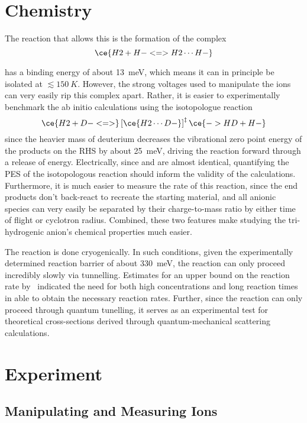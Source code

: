 \documentclass[12pt]{article}
\begin{document}
\section{Chemistry}
The reaction that allows this is the formation of the complex
\begin{equation}
    \ce{H2 + H- <=> H2\cdots H-} \label{eq:h3}
\end{equation}

 has a binding energy of about \SI{13}{meV}, which means it can in principle be isolated at \( \lesssim\SI{150}{K} \). However, the strong voltages used to manipulate the ions can very easily rip this complex apart. Rather, it is easier to experimentally benchmark the ab initio calculations using the isotopologue reaction
\begin{equation}
    \ce{H2 + D- <=>} \left[\ce{H2\cdots D-} \right]^\ddagger \ce{-> HD + H- } \label{eq:h2d}
\end{equation}
since the heavier mass of deuterium decreases the vibrational zero point energy of the products on the RHS by about \SI{25}{meV}, driving the reaction forward through a release of energy. Electrically, since  and  are almost identical, quantifying the PES of the isotopologous reaction should inform the validity of the  calculations. Furthermore, it is much easier to measure the rate of this reaction, since the end products don't back-react to recreate the starting material, and all anionic species can very easily be separated by their charge-to-mass ratio by either time of flight or cyclotron radius. Combined, these two features make studying the tri-hydrogenic anion's chemical properties much easier.

The reaction is done cryogenically. In such conditions, given the experimentally determined reaction barrier of about \SI{330}{meV}\cite{zimmer_crossed-beam_1995}, the reaction can only proceed incredibly slowly via tunnelling. Estimates for an upper bound on the reaction rate by~\cite{endres_upper_2017} indicated the need for both high concentrations and long reaction times in able to obtain the necessary reaction rates. Further, since the reaction can only proceed through quantum tunelling, it serves as an experimental test for theoretical cross-sections derived through quantum-mechanical scattering calculations.

\section{Experiment}
\subsection{Manipulating and Measuring Ions}
\end{document}
